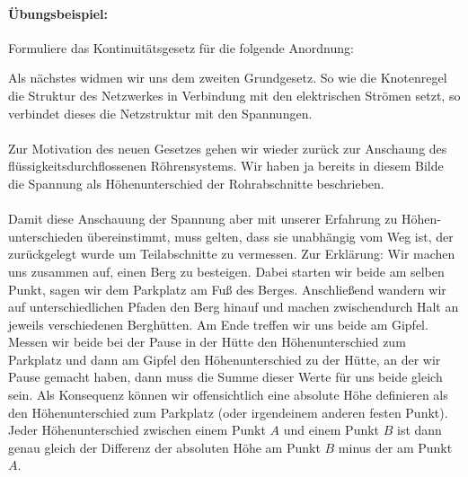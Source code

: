 \documentclass[11pt,a4paper,leqno]{report}
\numberwithin{equation}{chapter}
\begin{document}
\paragraph{\"Ubungsbeispiel:} Formuliere das Kontinuit\"atsgesetz f\"ur die folgende Anordnung:
\begin{figure}[H]
\end{figure}
\noindent
Als n\"achstes widmen wir uns dem zweiten Grundgesetz. So wie die Knotenregel die Struktur des Netzwerkes in Verbindung mit den elektrischen Str\"omen setzt, so verbindet dieses die Netzstruktur mit den Spannungen.\\
\\
Zur Motivation des neuen Gesetzes gehen wir wieder zur\"uck zur Anschaung des fl\"ussigkeitsdurchflossenen R\"ohrensystems. Wir haben ja bereits in diesem Bilde die Spannung als H\"ohenunterschied der Rohrabschnitte beschrieben.\\
\\
Damit diese Anschauung der Spannung aber mit unserer Erfahrung zu H\"ohen- unterschieden \"ubereinstimmt, muss gelten, dass sie unabh\"angig vom Weg ist, der zur\"uckgelegt wurde um Teilabschnitte zu vermessen. Zur Erkl\"arung: Wir machen uns zusammen auf, einen Berg zu besteigen. Dabei starten wir beide am selben Punkt, sagen wir dem Parkplatz am Fu\ss{} des Berges. Anschlie\ss{}end wandern wir auf unterschiedlichen Pfaden den Berg hinauf und machen zwischendurch Halt an jeweils verschiedenen Bergh\"utten. Am Ende treffen wir uns beide am Gipfel. Messen wir beide bei der Pause in der H\"utte den H\"ohenunterschied zum Parkplatz und dann am Gipfel den H\"ohenunterschied zu der H\"utte, an der wir Pause gemacht haben, dann muss die Summe dieser Werte f\"ur uns beide gleich sein. Als Konsequenz k\"onnen wir offensichtlich eine absolute H\"ohe definieren als den H\"ohenunterschied zum Parkplatz (oder irgendeinem anderen festen Punkt). Jeder H\"ohenunterschied zwischen einem Punkt $A$ und einem Punkt $B$ ist dann genau gleich der Differenz der absoluten H\"ohe am Punkt $B$ minus der am Punkt $A$.\\
\\
\end{document}
